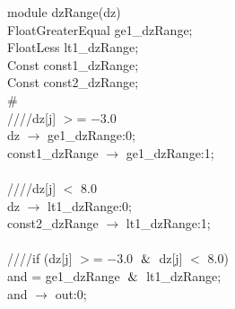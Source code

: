 module dzRange(dz){ \\
\hspace*{2em}FloatGreaterEqual ge1\_dzRange; \\
\hspace*{2em}FloatLess lt1\_dzRange; \\
\hspace*{2em}Const const1\_dzRange; \\
\hspace*{2em}Const const2\_dzRange; \\
\# \\
\hspace*{2em}////dz[j] $>$= $-$3.0 \\
\hspace*{2em}dz $\rightarrow$ ge1\_dzRange:0; \\
\hspace*{2em}const1\_dzRange $\rightarrow$ ge1\_dzRange:1; \\
   \\
   \hspace*{2em}////dz[j] $<$ 8.0 \\
   \hspace*{2em}dz $\rightarrow$ lt1\_dzRange:0; \\
   \hspace*{2em}const2\_dzRange $\rightarrow$ lt1\_dzRange:1; \\
   \\
   \hspace*{2em}////if (dz[j] $>$= $-$3.0 $\And$ dz[j] $<$ 8.0) \\
   \hspace*{2em} and = ge1\_dzRange $\And$ lt1\_dzRange; \\
   \hspace*{2em}and $\rightarrow$ out:0; \\
} \\
\\
\\
